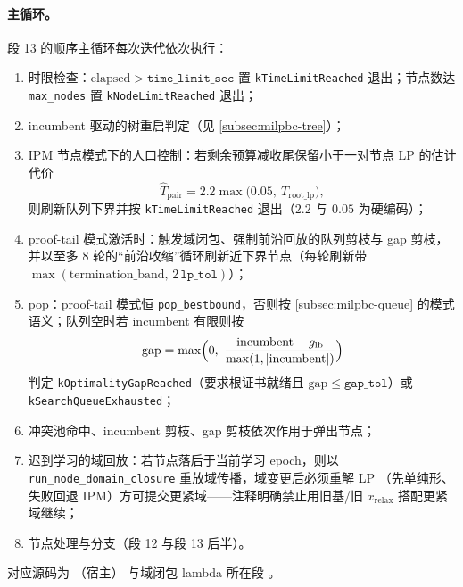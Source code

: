 \paragraph{主循环。}
段 13 的顺序主循环每次迭代依次执行：
\begin{enumerate}
  \item 时限检查：$\mathrm{elapsed}>\texttt{time\_limit\_sec}$ 置
        \texttt{kTimeLimitReached} 退出；节点数达 \texttt{max\_nodes} 置
        \texttt{kNodeLimitReached} 退出；
  \item incumbent 驱动的树重启判定（见 \ref{subsec:milpbc-tree}）；
  \item IPM 节点模式下的人口控制：若剩余预算减收尾保留小于一对节点 LP 的估计
        代价
        \begin{equation}
          \hat T_{\mathrm{pair}}=2.2\max\bigl(0.05,\ T_{\mathrm{root\_lp}}\bigr),
        \end{equation}
        则刷新队列下界并按 \texttt{kTimeLimitReached} 退出（$2.2$ 与 $0.05$
        为硬编码）；
  \item proof-tail 模式激活时：触发域闭包、强制前沿回放的队列剪枝与 gap 剪枝，
        并以至多 8 轮的``前沿收缩''循环刷新近下界节点（每轮刷新带
        $\max(\mathrm{termination\_band},\,2\,\texttt{lp\_tol})$）；
  \item pop：proof-tail 模式恒 \texttt{pop\_bestbound}，否则按
        \ref{subsec:milpbc-queue} 的模式语义；队列空时若 incumbent 有限则按
        \begin{equation}
          \mathrm{gap}=\max\Bigl(0,\ \frac{\mathrm{incumbent}-g_{\mathrm{lb}}}
          {\max(1,|\mathrm{incumbent}|)}\Bigr)
        \end{equation}
        判定 \texttt{kOptimalityGapReached}（要求根证书就绪且
        $\mathrm{gap}\le\texttt{gap\_tol}$）或 \texttt{kSearchQueueExhausted}；
  \item 冲突池命中、incumbent 剪枝、gap 剪枝依次作用于弹出节点；
  \item 迟到学习的域回放：若节点落后于当前学习 epoch，则以
        \texttt{run\_node\_domain\_closure} 重放域传播，域变更后必须重解 LP
        （先单纯形、失败回退 IPM）方可提交更紧域——注释明确禁止用旧基/旧
        $x_{\mathrm{relax}}$ 搭配更紧域继续；
  \item 节点处理与分支（段 12 与段 13 后半）。
\end{enumerate}
对应源码为
（宿主）
与域闭包 lambda 所在段
。


